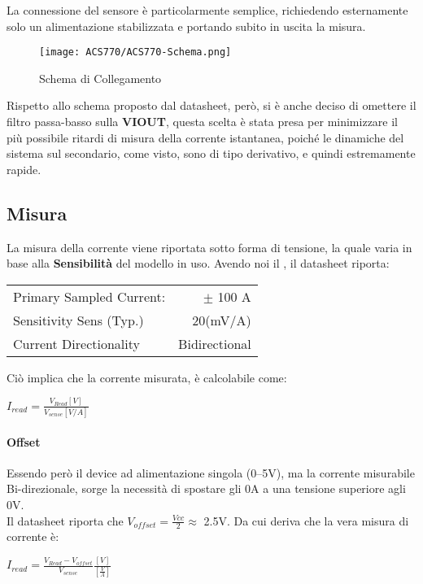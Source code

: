 La connessione del sensore è particolarmente semplice, richiedendo esternamente solo un alimentazione stabilizzata e portando subito in uscita la misura.
\begin{figure}[h]
	\centering
	\texttt{[image: ACS770/ACS770-Schema.png]}
	\caption[ Schema di collegamento]{Schema di Collegamento}
\end{figure}

\noindent
Rispetto allo schema proposto dal datasheet, però, si è anche deciso di omettere il filtro passa-basso sulla \textbf{VIOUT}, questa scelta è stata presa per minimizzare il più possibile ritardi di misura della corrente istantanea, poiché le dinamiche del sistema sul secondario, come visto, sono di tipo derivativo, e quindi estremamente rapide.\\

\subsection{Misura}
La misura della corrente viene riportata sotto forma di tensione, la quale varia in base alla \textbf{Sensibilità} del modello in uso. 
Avendo noi il , il datasheet riporta:
\begin{center}
	\begin{tabular}[t]{|l r|}
		\hline
		Primary Sampled Current: & $\pm$ 100 A   \\
		Sensitivity Sens (Typ.)  & 20(mV/A)      \\
		Current Directionality   & Bidirectional \\
		\hline
	\end{tabular}
\end{center}

\noindent
Ciò implica che la corrente misurata, è calcolabile come:
{\large \begin{center}
	$I_{read} = \frac{V_{Read}[V]}{V_{sense}[V/A]}$
\end{center}
}
\paragraph{Offset}
Essendo però il device ad alimentazione singola (0--5V), ma la corrente misurabile Bi-direzionale, sorge la necessità di spostare gli 0A a una tensione superiore agli 0V.\\
Il datasheet riporta che $V_{offset} = \frac{Vcc}{2}\approx$ 2.5V. Da cui deriva che la vera misura di corrente è:
{\LARGE
\begin{center}
	$I_{read} = \frac{V_{Read}-V_{offset}}{V_{sense}}\frac{[V]}{[\frac{V}{A}]}$
\end{center}
}

